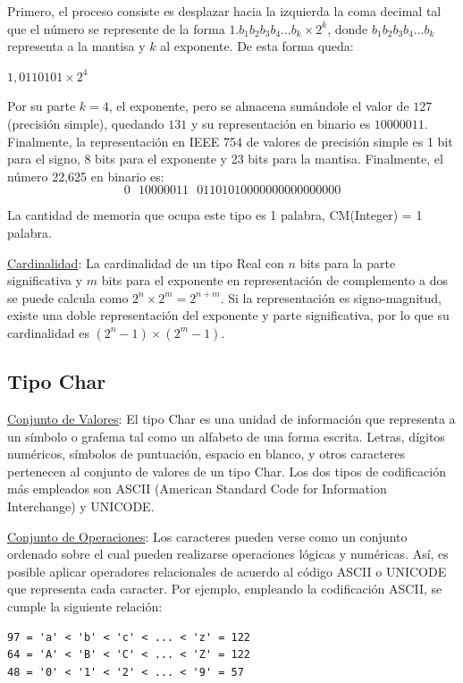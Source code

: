 Primero, el proceso consiste es desplazar hacia la izquierda la coma decimal tal que el número se represente de la forma $1.b_1b_2b_3b_4 \dots b_k \times 2^k$, donde $b_1b_2b_3b_4 \dots b_k$ representa a la mantisa y $k$ al exponente. De esta forma queda:

\begin{center}
$1,0110101 \times 2^4$
\end{center}

Por su parte $k=4$, el exponente, pero se almacena sumándole el valor de $127$ (precisión simple), quedando $131$ y su representación en binario es $10000011$. Finalmente, la representación en IEEE 754 de valores de precisión simple es 1 bit para el signo, 8 bits para el exponente y 23 bits para la mantisa. Finalmente, el número 22,625 en binario es:
$$0\mbox{ }10000011\mbox{ }01101010000000000000000$$

La cantidad de memoria que ocupa este tipo es 1 palabra, CM(Integer) = 1 palabra.

\underline{Cardinalidad}: La cardinalidad de un tipo Real con $n$ bits para la parte significativa y $m$ bits para el exponente en representación de complemento a dos se puede calcula como $2^n \times 2^m = 2^{n+m}$. Si la representación es signo-magnitud, existe una doble representación del exponente y parte significativa, por lo que su cardinalidad es $(2^n - 1)\times(2^m - 1)$.

\subsection{Tipo Char}

\underline{Conjunto de Valores}: El tipo Char es una unidad de información que representa a un símbolo o grafema tal como un alfabeto de una forma escrita. Letras, dígitos numéricos, símbolos de puntuación, espacio en blanco, y otros caracteres pertenecen al conjunto de valores de un tipo Char. Los dos tipos de codificación más empleados son ASCII (American Standard Code for Information Interchange) y UNICODE.

\underline{Conjunto de Operaciones}: Los caracteres pueden verse como un conjunto ordenado sobre el cual pueden realizarse operaciones lógicas y numéricas. Así, es posible aplicar operadores relacionales de acuerdo al código ASCII o UNICODE que representa cada caracter. Por ejemplo, empleando la codificación ASCII, se cumple la siguiente relación:

\begin{lstlisting}[upquote=true, language=pseudo]
97 = 'a' < 'b' < 'c' < ... < 'z' = 122
64 = 'A' < 'B' < 'C' < ... < 'Z' = 122
48 = '0' < '1' < '2' < ... < '9' = 57
\end{lstlisting}


